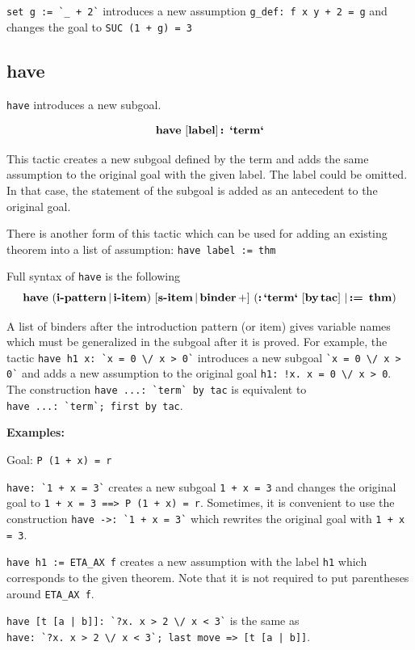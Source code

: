 \documentclass[a4paper]{article}
\newcommand{\xx}[1]{\mathop{\text{\bf #1}}}
\begin{document}
\verb|set g := `_ + 2`| introduces a new assumption \verb|g_def: f x y + 2 = g| and changes the goal to \verb|SUC (1 + g) = 3|


\subsection{have}
\verb|have| introduces a new subgoal.

$$\xx{have}\ [\xx{label}]\xx{:}\ \xx{`term`}$$

This tactic creates a new subgoal defined by the term and adds the same assumption to the original goal with the given label. The label could be omitted. In that case, the statement of the subgoal is added as an antecedent to the original goal.

There is another form of this tactic which can be used for adding an existing theorem into a list of assumption: \verb$have label := thm$

Full syntax of \verb|have| is the following
\[
\xx{have}\ (\xx{i-pattern} | \xx{i-item})\ [\xx{s-item} | \xx{binder}+]
\ (\xx{:} \xx{`term`}\ [\xx{by} \xx{tac}]\ | \xx{:=}\ \xx{thm})
\]

A list of binders after the introduction pattern (or item) gives variable names which must be generalized in the subgoal after it is proved. For example, the tactic \verb|have h1 x: `x = 0 \/ x > 0`| introduces a new subgoal \verb|`x = 0 \/ x > 0`| and adds a new assumption to the original goal \verb'h1: !x. x = 0 \/ x > 0'. The construction \verb|have ...: `term` by tac| is equivalent to \\[0pt]
\verb|have ...: `term`; first by tac|.

{\bf Examples:}

Goal: \verb|P (1 + x) = r|

\verb|have: `1 + x = 3`| creates a new subgoal \verb|1 + x = 3| and changes the original goal to \verb|1 + x = 3 ==> P (1 + x) = r|. Sometimes, it is convenient to use the construction \verb|have ->: `1 + x = 3`| which rewrites the original goal with \verb|1 + x = 3|.

\verb|have h1 := ETA_AX f| creates a new assumption with the label \verb|h1| which corresponds to the given theorem. Note that it is not required to put parentheses around \verb|ETA_AX f|.

\verb'have [t [a | b]]: `?x. x > 2 \/ x < 3`' is the same as\\[0pt]
\verb'have: `?x. x > 2 \/ x < 3`; last move => [t [a | b]]'.
\end{document}
